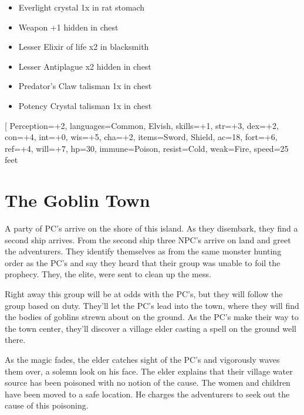 \begin{multicols}{2}
  \begin{itemize}
    \item Everlight crystal 1x in rat stomach
    \item Weapon +1 hidden in chest
    \item Lesser Elixir of life x2 in blacksmith
    \item Lesser Antiplague x2 hidden in chest
    \item Predator's Claw talisman 1x in chest
    \item Potency Crystal talisman 1x in chest
  \end{itemize}

  \begin{creaturebox}[title=My Monster]
    \basics[
      Perception=+2,
      languages={Common, Elvish},
      skills=+1,
      str=+3,
      dex=+2,
      con=+4,
      int=+0,
      wis=+5,
      cha=+2,
      items={Sword, Shield},
      ac=18,
      fort=+6,
      ref=+4,
      will=+7,
      hp=30,
      immune={Poison},
      resist={Cold},
      weak={Fire},
      speed={25 feet}
    
  \end{creaturebox}

  \section{The Goblin Town}
  A party of PC's arrive on the shore of this island. As they disembark, they find a second ship arrives. From the second ship three NPC's arrive on land and greet the adventurers. They identify themselves as from the same monster hunting order as the PC's and say they heard that their group was unable to foil the prophecy. They, the elite, were sent to clean up the mess.

  Right away this group will be at odds with the PC's, but they will follow the group based on duty. They'll let the PC's lead into the town, where they will find the bodies of goblins strewn about on the ground. As the PC's make their way to the town center, they'll discover a village elder casting a spell on the ground well there.

  As the magic fades, the elder catches sight of the PC's and vigorously waves them over, a solemn look on his face. The elder explains that their village water source has been poisoned with no notion of the cause. The women and children have been moved to a safe location. He charges the adventurers to seek out the cause of this poisoning.


\end{multicols}
